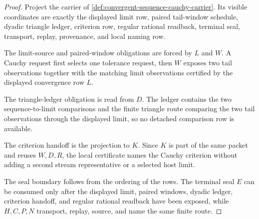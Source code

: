 \begin{proof}
Project the carrier of \autoref{def:convergent-sequence-cauchy-carrier}. Its visible coordinates are exactly the displayed limit row, paired tail-window schedule, dyadic triangle ledger, criterion row, regular rational readback, terminal seal, transport, replay, provenance, and local naming row.

The limit-source and paired-window obligations are forced by $L$ and $W$. A Cauchy request first selects one tolerance request, then $W$ exposes two tail observations together with the matching limit observations certified by the displayed convergence row $L$.

The triangle-ledger obligation is read from $D$. The ledger contains the two sequence-to-limit comparisons and the finite triangle route comparing the two tail observations through the displayed limit, so no detached comparison row is available.

The criterion handoff is the projection to $K$. Since $K$ is part of the same packet and reuses $W,D,R$, the local certificate names the Cauchy criterion without adding a second stream representative or a selected host limit.

The seal boundary follows from the ordering of the rows. The terminal seal $E$ can be consumed only after the displayed limit, paired windows, dyadic ledger, criterion handoff, and regular rational readback have been exposed, while $H,C,P,N$ transport, replay, source, and name the same finite route.
\end{proof}

